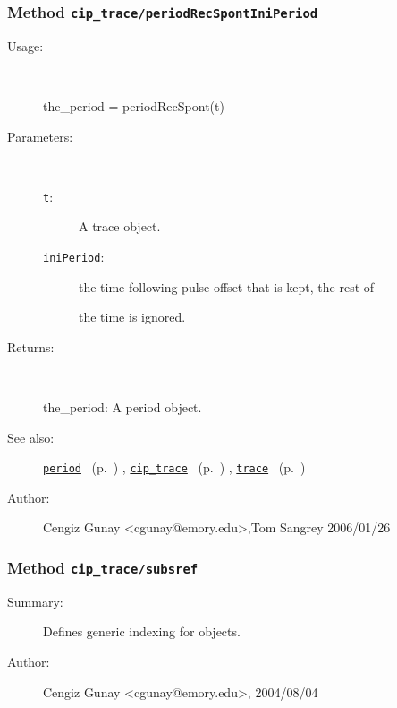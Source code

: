 \subsubsection[Method \texttt{periodRecSpontIniPeriod}]{Method \texttt{cip\_trace/periodRecSpontIniPeriod}}%
%
\label{ref_cip_trace__periodRecSpontIniPeriod}%
\hypertarget{ref_cip_trace__periodRecSpontIniPeriod}{}%
\begin{description}
%
\item[Usage:]~%
\begin{lyxcode}%
the\_period = periodRecSpont(t)
%
\end{lyxcode}%
%
%
\item[Parameters:]~
\begin{description}%
\item[\texttt{t}:]
 A trace object.
\item[\texttt{iniPeriod}:]
 the time following pulse offset that is kept, the rest of

the time is ignored.\end{description}%
%
\item[Returns:]~

	the\_period: A period object.
%
%
\item[See also:]%
\hyperlink{ref_period}{\texttt{period}}%
\ (p.~\pageref{ref_period})%
%
, \hyperlink{ref_cip_trace}{\texttt{cip\_trace}}%
\ (p.~\pageref{ref_cip_trace})%
%
, \hyperlink{ref_trace}{\texttt{trace}}%
\ (p.~\pageref{ref_trace})%
%
%
\item[Author:]%
Cengiz Gunay <cgunay@emory.edu>,Tom Sangrey 2006/01/26%
\end{description}
\methodline%
\subsubsection[Method \texttt{subsref}]{Method \texttt{cip\_trace/subsref}}%
%
\label{ref_cip_trace__subsref}%
\hypertarget{ref_cip_trace__subsref}{}%
\begin{description}
\item[Summary:]Defines generic indexing for objects.
%
%
%
%
%
%
%
\item[Author:]%
Cengiz Gunay <cgunay@emory.edu>, 2004/08/04%
\end{description}
\methodline%
